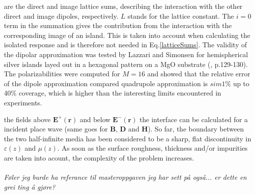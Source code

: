 %
are the direct and image lattice sums, describing the interaction with the other direct and 
image dipoles, respectively. $L$ stands for the lattice constant. The $i=0$ term in the summation
gives the contribution from the interaction with the corresponding image of an island. This 
is taken into account when calculating the isolated response and is therefore not needed in
Eq.\eqref{latticeSums}. 
The validity of the dipolar approximation was tested by Lazzari and Simonsen
for hemispherical silver islands layed out in a hexagonal pattern on a MgO substrate
(\cite{Lazzari2002}, p.129-130). The polarizabilities were computed for $M = 16$ 
and showed that the relative error of the dipole approximation compared quadrupole approximation is
$sim 1\%$ up to 40\% coverage, which is higher than the interesting limits encountered in 
experiments.




















%











the fields above $\boldsymbol{E}^+(\boldsymbol{r})$ and below $\boldsymbol{E}^-(\boldsymbol{r})$ the interface can be calculated for a incident place wave 
(same goes for $\boldsymbol{B}$, $\boldsymbol{D}$ and $\boldsymbol{H}$).
So far, the boundary between the two half-infinite media has been considered to be a sharp, flat discontinuity in $\varepsilon(z)$ and $\mu (z)$. 
As soon as the surface roughness, thickness and/or impurities are taken into acount, the complexity of the problem increases.
\\
\\
\textit{Føler jeg burde ha referance til masteroppgaven jeg har sett på også... er dette en grei ting å gjøre?}








